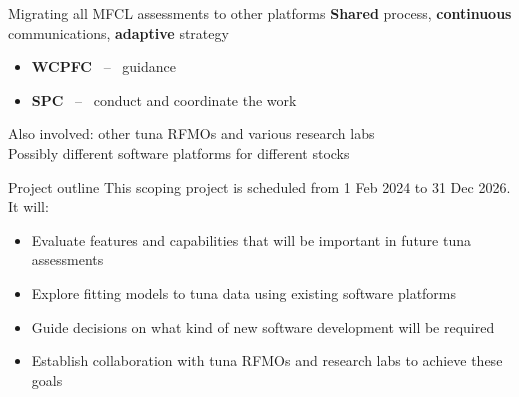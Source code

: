 \documentclass[aspectratio=169,fleqn]{beamer}
\begin{document}

\begin{frame}{Migrating all MFCL assessments to other platforms}\small
  \textbf{\darkgreen Shared} process, {\darkgreen\bf continuous} communications,
  {\darkgreen\bf adaptive} strategy\\[3ex]
  \begin{itemize}
    \item[] {\blue\bf WCPFC} ~--~ guidance\\[2ex]
    \item[] {\blue\bf SPC} ~--~ conduct and coordinate the work\\[4ex]
  \end{itemize}
  Also involved: other tuna RFMOs and various research labs\\[4ex]
  Possibly different software platforms for different stocks\\[4ex]
\end{frame}


\begin{frame}{Project outline}\small
  This scoping project is scheduled from 1 Feb 2024 to 31 Dec 2026. It
  will:\\[3ex]
  \begin{itemize}
    \item[] Evaluate features and capabilities that will be important in future
    tuna assessments\\[3ex]
    \item[] Explore fitting models to tuna data using existing software
    platforms\\[3ex]
    \item[] Guide decisions on what kind of new software development will be
    required\\[3ex]
    \item[] Establish collaboration with tuna RFMOs and research labs to achieve
    these goals\\[3ex]
  \end{itemize}
\end{frame}

\end{document}
